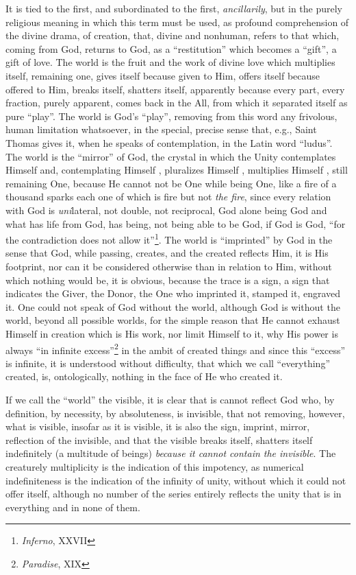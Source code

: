 It is tied to the first, and subordinated to the first, \emph{ancillarily}, but in the purely religious meaning in which this term must be used, as profound comprehension of the divine drama, of creation, that, divine and nonhuman, refers to that which, coming from God, returns to God, as a ``restitution'' which becomes a ``gift'', a gift of love. The world is the fruit and the work of divine love which multiplies itself, remaining one, gives itself because given to Him, offers itself because offered to Him, breaks itself, shatters itself, apparently because every part, every fraction, purely apparent, comes back in the All, from which it separated itself as pure ``play''. The world is God's ``play'', removing from this word any frivolous, human limitation whatsoever, in the special, precise sense that, e.g., Saint Thomas gives it, when he speaks of contemplation, in the Latin word ``ludus''. The world is the ``mirror'' of God, the crystal in which the Unity contemplates Himself and, contemplating Himself , pluralizes Himself , multiplies Himself , still remaining One, because He cannot not be One while being One, like a fire of a thousand sparks each one of which is fire but not \emph{the fire}, since every relation with God is \emph{uni}lateral, not double, not reciprocal, God alone being God and what has life from God, has being, not being able to be God, if God is God, ``for the contradiction does not allow it''\footnote{\emph{Inferno}, XXVII}. The world is ``imprinted'' by God in the sense that God, while passing, creates, and the created reflects Him, it is His footprint, nor can it be considered otherwise than in relation to Him, without which nothing would be, it is obvious, because the trace is a sign, a sign that indicates the Giver, the Donor, the One who imprinted it, stamped it, engraved it. One could not speak of God without the world, although God is without the world, beyond all possible worlds, for the simple reason that He cannot exhaust Himself in creation which is His work, nor limit Himself to it, why His power is always ``in infinite excess''\footnote{\emph{Paradise}, XIX} in the ambit of created things and since this ``excess'' is infinite, it is understood without difficulty, that which we call ``everything'' created, is, ontologically, nothing in the face of He who created it.

If we call the ``world'' the visible, it is clear that is cannot reflect God who, by definition, by necessity, by absoluteness, is invisible, that not removing, however, what is visible, insofar as it is visible, it is also the sign, imprint, mirror, reflection of the invisible, and that the visible breaks itself, shatters itself indefinitely (a multitude of beings) \emph{because it cannot contain the invisible}. The creaturely multiplicity is the indication of this impotency, as numerical indefiniteness is the indication of the infinity of unity, without which it could not offer itself, although no number of the series entirely reflects the unity that is in everything and in none of them.


